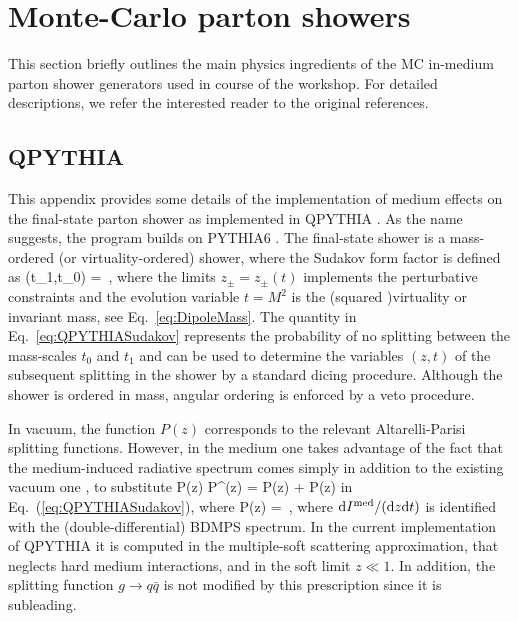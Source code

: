 
\section{Monte-Carlo parton showers}
\label{app:models}

This section briefly outlines the main physics ingredients of the MC in-medium parton shower generators used in course of the workshop. For detailed descriptions, we refer the interested reader to the original references.

\subsection{QPYTHIA}
\label{app:qpythia}

This appendix provides some details of the implementation of medium effects on the final-state parton shower as implemented in QPYTHIA \cite{Armesto:2009fj}. As the name suggests, the program builds on PYTHIA6 \cite{Sjostrand:2007gs,Sjostrand:2008vc}. The final-state shower is a mass-ordered (or virtuality-ordered) shower, where the Sudakov form factor is defined as
\beq
\label{eq:QPYTHIASudakov}
\Delta(t_1,t_0) = \exp{} \,,
\eeq
where the limits $z_\pm = z_\pm(t)$ implements the perturbative constraints and the evolution variable $t = M^2$ is the (squared )virtuality or invariant mass, see Eq.~\eqref{eq:DipoleMass}. The quantity in Eq.~\eqref{eq:QPYTHIASudakov} represents the probability of no splitting between the mass-scales $t_0$ and $t_1$ and can be used to determine the variables $(z,t)$ of the subsequent splitting in the shower by a standard dicing procedure. Although the shower is ordered in mass, angular ordering is enforced by a veto procedure.

In vacuum, the function $P(z)$ corresponds to the relevant Altarelli-Parisi splitting functions. However, in the medium one takes advantage of the fact that the medium-induced radiative spectrum comes simply in addition to the existing vacuum one \cite{Wang:2001ifa,Polosa:2006hb}, to substitute
\beq
P(z) \to P^\tot(z) = P(z) + \Delta P(z)
\eeq
in Eq.~(\ref{eq:QPYTHIASudakov}), where 
\beq
\Delta P(z) =   \,,
\eeq
where $\text{d} I^{\text{med}} /(\text{d} z \text{d} t)$ is identified with the (double-differential) BDMPS spectrum. In the current implementation of QPYTHIA it is computed in the multiple-soft scattering approximation, that neglects hard medium interactions, and in the soft limit $z \ll 1$. In addition, the splitting function $g \to q\bar q$ is not modified by this prescription since it is subleading.

